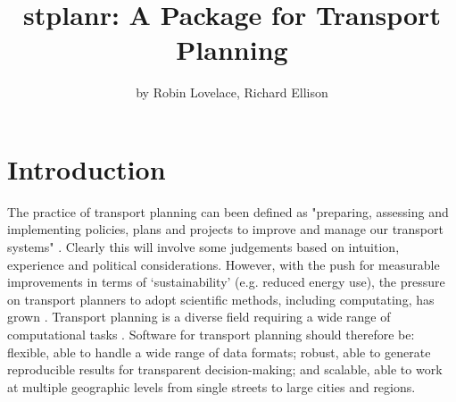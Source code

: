\title{stplanr: A Package for Transport Planning}
\author{by Robin Lovelace, Richard Ellison}

\maketitle


\section{Introduction}\label{introduction}

The practice of transport planning can been defined as
"preparing, assessing and implementing policies, plans and projects to
improve and manage our transport systems"
\citep{jones_road_2014}.
Clearly this will involve some judgements based on intuition, experience and political considerations.
However, with the push for measurable improvements in terms of `sustainability' (e.g. reduced energy use),
the pressure on transport planners to adopt scientific methods, including computating, has grown
\citep{balmer_matsim-t:_2009}.
Transport planning is a diverse field requiring a wide range of computational tasks \citep{boyce_forecasting_2015}.
Software for transport planning should therefore be:
flexible, able to handle a wide range of data formats;
robust, able to generate reproducible results for transparent decision-making;
and scalable, able to work at multiple geographic levels from single streets to large cities and regions.

